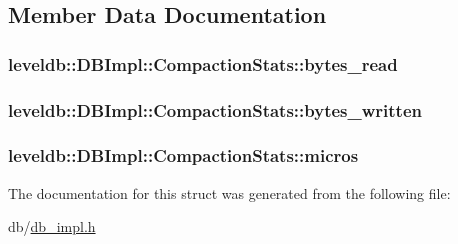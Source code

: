 \subsection{Member Data Documentation}
\hypertarget{structleveldb_1_1_d_b_impl_1_1_compaction_stats_a695c4b05f9ba991f2a5fa4fd801dbf53}{
\subsubsection[{bytes\-\_\-read}]{ leveldb\-::\-D\-B\-Impl\-::\-Compaction\-Stats\-::bytes\-\_\-read}}\label{structleveldb_1_1_d_b_impl_1_1_compaction_stats_a695c4b05f9ba991f2a5fa4fd801dbf53}
\hypertarget{structleveldb_1_1_d_b_impl_1_1_compaction_stats_a8a2b2fde9bec83da2a82b6981dfc036d}{
\subsubsection[{bytes\-\_\-written}]{ leveldb\-::\-D\-B\-Impl\-::\-Compaction\-Stats\-::bytes\-\_\-written}}\label{structleveldb_1_1_d_b_impl_1_1_compaction_stats_a8a2b2fde9bec83da2a82b6981dfc036d}
\hypertarget{structleveldb_1_1_d_b_impl_1_1_compaction_stats_a7c64b7eadf84a5e4a5ff6482df7cefa1}{
\subsubsection[{micros}]{ leveldb\-::\-D\-B\-Impl\-::\-Compaction\-Stats\-::micros}}\label{structleveldb_1_1_d_b_impl_1_1_compaction_stats_a7c64b7eadf84a5e4a5ff6482df7cefa1}


The documentation for this struct was generated from the following file\-:\begin{DoxyCompactItemize}
\item 
db/\hyperlink{db__impl_8h}{db\-\_\-impl.\-h}\end{DoxyCompactItemize}
